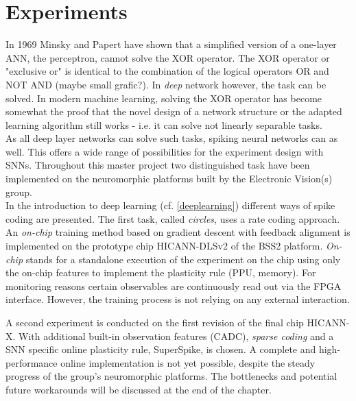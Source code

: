 \chapter{Experiments}
In 1969 Minsky and Papert have shown that a simplified version of a one-layer ANN, the perceptron, cannot solve the XOR operator. The XOR operator or "exclusive or" is identical to the combination of the logical operators OR and NOT AND (maybe small grafic?). In \textit{deep} network however, the task can be solved. In modern machine learning, solving the XOR operator has become somewhat the proof that the novel design of a network structure or the adapted learning algorithm still works - i.e. it can solve not linearly separable tasks.\\

As all deep layer networks can solve such tasks, spiking neural networks can as well. This offers a wide range of possibilities for the experiment design with SNNs. Throughout this master project two distinguished task have been implemented on the neuromorphic platforms built by the Electronic Vision(s) group.\\


In the introduction to deep learning (cf. \ref{deeplearning}) different ways of spike coding are presented. The first task, called \textit{circles}, uses a rate coding approach. An \textit{on-chip} training method based on gradient descent with feedback alignment is implemented on the prototype chip HICANN-DLSv2 of the BSS2 platform. \textit{On-chip} stands for a standalone execution of the experiment on the chip using only the on-chip features to implement the plasticity rule (PPU, memory). For monitoring reasons certain observables are continuously read out via the FPGA interface. However, the training process is not relying on any external interaction.

A second experiment is conducted on the first revision of the final chip HICANN-X. With additional built-in observation features (CADC), \textit{sparse coding} and a SNN specific online plasticity rule, SuperSpike, is chosen. A complete and high-performance online implementation is not yet possible, despite the steady progress of the group's neuromorphic platforms. The bottlenecks and potential future workarounds will be discussed at the end of the chapter.\\


\newpage


